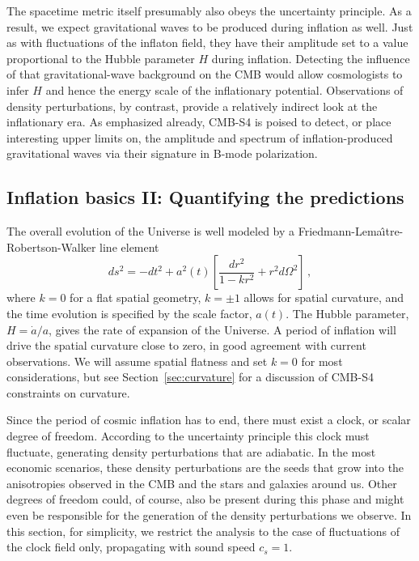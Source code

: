 The spacetime metric itself presumably also obeys the uncertainty principle. As a result, we expect gravitational waves to be produced during inflation as well. Just as with fluctuations of the inflaton field, they have their amplitude set to a value proportional to the Hubble parameter $H$ during inflation. Detecting the influence of that gravitational-wave background on the CMB would allow cosmologists to infer $H$ and hence the energy scale of the inflationary potential. Observations of density perturbations, by contrast, provide a relatively indirect look at the inflationary era. As emphasized already, CMB-S4 is poised to detect, or place interesting upper limits on, the amplitude and spectrum of inflation-produced gravitational waves via their signature in B-mode polarization. 


\subsection{Inflation basics II: Quantifying the predictions}

The overall evolution of the Universe is well modeled by a Friedmann-Lema\^{\i}tre-Robertson-Walker line element
\begin{equation}
ds^2=-dt^2+a^2(t)\left[\frac{dr^2}{1-kr^2}+r^2d\Omega^2\right]\,,
\end{equation}
where $k=0$ for a flat spatial geometry, $k=\pm1$ allows for spatial curvature, and the time evolution is specified by the scale factor, $a(t)$. The Hubble parameter, $H=\dot{a}/a$, gives the rate of expansion of the Universe. A period of inflation will drive the spatial curvature close to zero, in good agreement with current observations. We will assume spatial flatness and set $k=0$ for most considerations, but see Section~\ref{sec:curvature} for a discussion of CMB-S4 constraints on curvature. 

Since the period of cosmic inflation has to end, there must exist a clock, or scalar degree of freedom. According to the uncertainty principle this clock must fluctuate, generating density perturbations that are adiabatic. In the most economic scenarios, these density perturbations are the seeds that grow into the anisotropies observed in the CMB and the stars and galaxies around us. Other degrees of freedom could, of course, also be present during this phase and might even be responsible for the generation of the density perturbations we observe. In this section, for simplicity, we restrict the analysis to the case of fluctuations of the clock field only, propagating with sound speed $c_s=1$.

